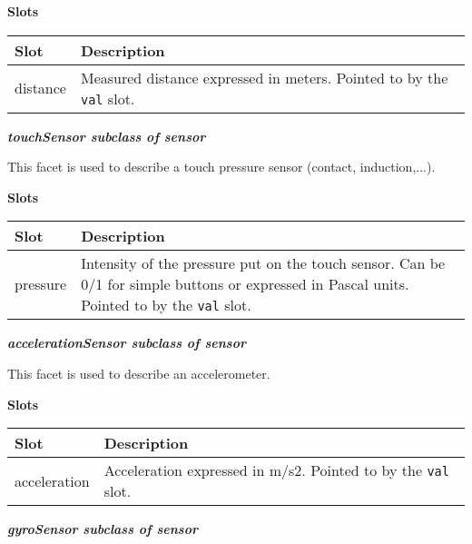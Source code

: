 \documentclass[a4paper]{article}
\begin{document}
{\sffamily\bfseries
Slots}

\begin{flushleft}
\tablehead{}
\begin{supertabular}{|m{2.8669999cm}|m{12.422cm}|}
\hline
{}\sffamily\bfseries Slot &
\sffamily\bfseries Description\\\hline
{} distance &
\sffamily Measured distance expressed in meters.
Pointed to by the \texttt{val} slot.\\\hline
\end{supertabular}
\end{flushleft}
{\sffamily\bfseries\itshape
 touchSensor  \textmd{subclass of sensor}}

{\sffamily
This facet is used to describe a touch pressure sensor (contact,
induction,...).}

{\sffamily\bfseries
Slots}

\begin{flushleft}
\tablehead{}
\begin{supertabular}{|m{2.8669999cm}|m{12.422cm}|}
\hline
{}\sffamily\bfseries Slot &
\sffamily\bfseries Description\\\hline
{} pressure &
\sffamily Intensity of the pressure put on the
touch sensor. Can be 0/1 for simple buttons or expressed in Pascal
units. Pointed to by the \texttt{val} slot.\\\hline
\end{supertabular}
\end{flushleft}
{\sffamily\bfseries\itshape
 accelerationSensor  \textmd{subclass of sensor}}

{\sffamily
This facet is used to describe an accelerometer.}

{\sffamily\bfseries
Slots}

\begin{flushleft}
\tablehead{}
\begin{supertabular}{|m{3.651cm}|m{11.639cm}|}
\hline
{}\sffamily\bfseries Slot &
\sffamily\bfseries Description\\\hline
{} acceleration &
\sffamily Acceleration expressed in m/s2.
Pointed to by the \texttt{val} slot.\\\hline
\end{supertabular}
\end{flushleft}
{\sffamily\bfseries\itshape
gyroSensor  \textmd{subclass of sensor}}
\end{document}
